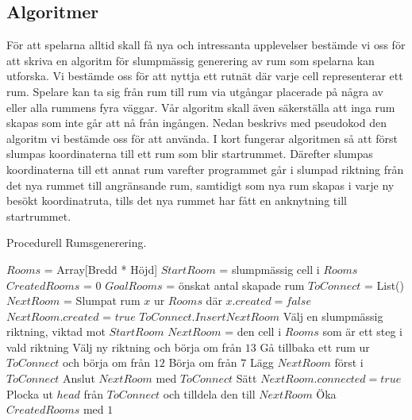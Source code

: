 \documentclass[a4paper]{article}
\begin{document}
\subsection{Algoritmer}
För att spelarna alltid skall få  nya och intressanta upplevelser bestämde vi oss för att skriva en algoritm för slumpmässig generering av rum som spelarna kan utforska. Vi
bestämde oss för att nyttja ett rutnät där varje cell representerar ett rum. Spelare kan ta sig från rum till rum via utgångar placerade på några av eller alla rummens fyra väggar.
Vår algoritm skall även säkerställa att inga rum skapas som inte går att nå från ingången. Nedan beskrivs med pseudokod den algoritm vi bestämde oss för att använda. I kort fungerar algoritmen så att först slumpas koordinaterna till ett rum som blir startrummet. Därefter slumpas koordinaterna till ett annat rum varefter programmet går i slumpad riktning från det nya rummet till angränsande rum, samtidigt som nya rum skapas i varje ny besökt koordinatruta, tills det nya rummet har fått en anknytning till startrummet.
\begin{algorithm}
\caption{Procedurell Rumsgenerering.}
\label{alg:RoomGen}
\begin{algorithmic}[1]
\State  $Rooms$ = Array[Bredd * Höjd]
\State  $StartRoom$ = slumpmässig cell i $Rooms$
\State  $CreatedRooms$ = $0$
\State  $GoalRooms$ = önskat antal skapade rum
\Repeat
\State $ToConnect$ = List()
\State $NextRoom$  =  Slumpat rum $x$ ur $Rooms$ där $x.created = false$
\State $NextRoom.created$ = $true$
\State $ToConnect.Insert NextRoom$
\State Välj en slumpmässig riktning, viktad mot $StartRoom$
\State $NextRoom$ = den cell i $Rooms$ som är ett steg i vald riktning
\State Välj ny riktning och börja om från $13$
\State Gå tillbaka ett rum ur $ToConnect$ och börja om från $12$
\State Börja om från $7$
\EndIf
\EndIf
{}
\State Lägg $NextRoom$ först i $ToConnect$
\EndIf
\EndWhile
{}
\State Anslut $NextRoom$ med $ToConnect$
\State Sätt $NextRoom.connected = true$
\State Plocka ut $head$ från $ToConnect$ och tilldela den till $NextRoom$
\State Öka $CreatedRooms$ med $1$
\EndWhile
{}
\EndFunction
\end{algorithmic}

\end{algorithm}
\end{document}
